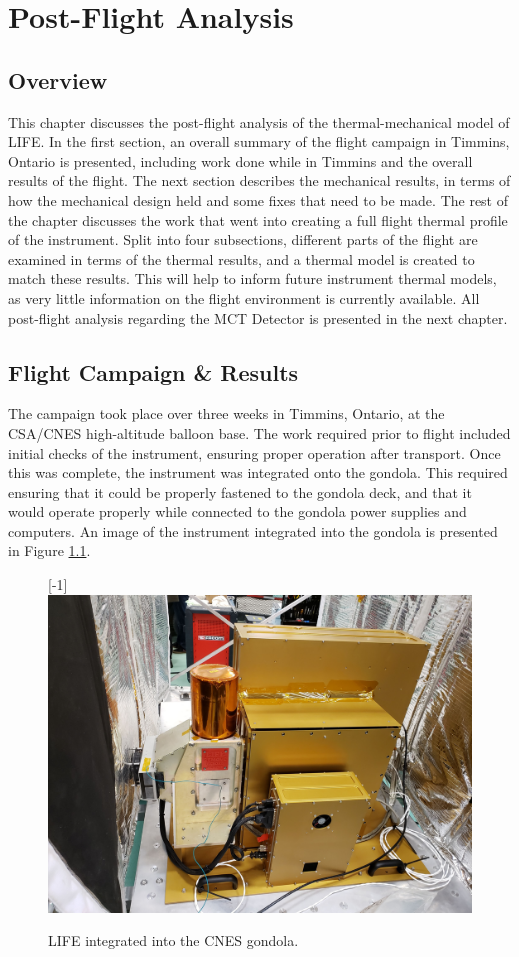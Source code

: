 \chapter{Post-Flight Analysis} \label{postflight}

\section{Overview}
This chapter discusses the post-flight analysis of the thermal-mechanical model of LIFE. In the first section, an overall summary of the flight campaign in Timmins, Ontario is presented, including work done while in Timmins and the overall results of the flight. The next section describes the mechanical results, in terms of how the mechanical design held and some fixes that need to be made. The rest of the chapter discusses the work that went into creating a full flight thermal profile of the instrument. Split into four subsections, different parts of the flight are examined in terms of the thermal results, and a thermal model is created to match these results. This will help to inform future instrument thermal models, as very little information on the flight environment is currently available. All post-flight analysis regarding the MCT Detector is presented in the next chapter.

\section{Flight Campaign \& Results}
The campaign took place over three weeks in Timmins, Ontario, at the CSA/CNES high-altitude balloon base. The work required prior to flight included initial checks of the instrument, ensuring proper operation after transport. Once this was complete, the instrument was integrated onto the gondola. This required ensuring that it could be properly fastened to the gondola deck, and that it would operate properly while connected to the gondola power supplies and computers. An image of the instrument integrated into the gondola is presented in Figure \ref{fig:LIFE_ON_GONDOLA}.

\begin{figure}
    \centering
    \scalebox{1}[-1]{\includegraphics[width=0.7\linewidth]{chap4_images/LIFE_on_gondola.jpg}}
    \caption{LIFE integrated into the CNES gondola.}
    \label{fig:LIFE_ON_GONDOLA}
\end{figure}

